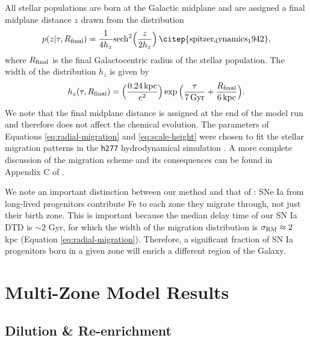 \documentclass[twocolumn,twocolappendix,linenumbers]{aastex631}
\newcommand{\kpc}{\,{\rm kpc}}
\begin{document}
All stellar populations are born at the Galactic midplane and are assigned a final midplane distance $z$ drawn from the distribution
\begin{equation}
    p(z|\tau,R_{\rm final}) = \frac{1}{4 h_z} {\rm sech}^2\Big(\frac{z}{2 h_z}\Big)\,
    {\rm \citep{spitzer_dynamics_1942}},
    \label{eq:sech-pdf}
\end{equation}
where $R_{\rm final}$ is the final Galactocentric radius of the stellar population. The width of the distribution $h_z$ is given by
\begin{equation}
    h_z(\tau,R_{\rm final}) = \Big(\frac{0.24\kpc}{e^2}\Big) \exp\Big(\frac{\tau}{7\,{\rm Gyr}} + \frac{R_{\rm final}}{6\kpc}\Big).
    \label{eq:scale-height}
\end{equation}
We note that the final midplane distance is assigned at the end of the model run and therefore does not affect the chemical evolution. The parameters of Equations \ref{eq:radial-migration} and \ref{eq:scale-height} were chosen to fit the stellar migration patterns in the {\tt h277} hydrodynamical simulation \citep{christensen_implementing_2012}. A more complete discussion of the migration scheme and its consequences can be found in Appendix C of \citet{dubay_galactic_2024}.

We note an important distinction between our method and that of \citet{spitoni_effect_2015}: SNe Ia from long-lived progenitors contribute Fe to each zone they migrate through, not just their birth zone. This is important because the median delay time of our SN Ia DTD is $\sim2$ Gyr, for which the width of the migration distribution is $\sigma_{\rm RM}\approx2$ kpc (Equation \ref{eq:radial-migration}). Therefore, a significant fraction of SN Ia progenitors born in a given zone will enrich a different region of the Galaxy.

\section{Multi-Zone Model Results}
\label{sec:multizone-results}

\subsection{Dilution \& Re-enrichment}
\label{sec:age-abundance}
\end{document}
